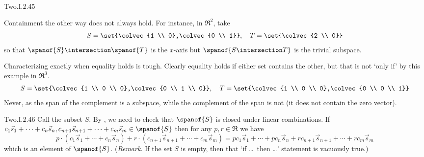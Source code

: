 \begin{ans}{Two.I.2.45}
\begin{exparts}
           Containment the other way does not always hold.
           For instance, in \( \Re^2 \), take
           \begin{equation*}
             S=\set{\colvec{1 \\ 0},\colvec{0 \\ 1}},\quad
             T=\set{\colvec{2 \\ 0}}
           \end{equation*}
           so that \( \spanof{S}\intersection\spanof{T} \) is the \( x \)-axis
           but \( \spanof{S\intersection T}  \) is the trivial subspace.

           Characterizing exactly when equality holds is tough.
           Clearly equality holds if either set contains the other, but that is
           not `only if' by this example in \( \Re^3 \).
           \begin{equation*}
             S=\set{\colvec{1 \\ 0 \\ 0},\colvec{0 \\ 1 \\ 0}},
             \quad
             T=\set{\colvec{1 \\ 0 \\ 0},\colvec{0 \\ 0 \\ 1}}
           \end{equation*}
        \partsitem Never, as the span of the complement is a subspace, while
          the complement of the span is not (it does not contain the zero
          vector).
      \end{exparts}
     
\end{ans}
\begin{ans}{Two.I.2.46}
      Call the subset \( S \).
      By ,
      we need to check that
      \( \spanof{S} \) is closed under linear combinations.
      If \( c_1\vec{s}_1+\dots+c_n\vec{s}_n,
        c_{n+1}\vec{s}_{n+1}+\dots+c_m\vec{s}_m\in\spanof{S} \) then
      for any \( p,r\in\Re \) we have
      \begin{equation*}
        p\cdot(c_1\vec{s}_1+\cdots+c_n\vec{s}_n)+
             r\cdot(c_{n+1}\vec{s}_{n+1}+\cdots+c_m\vec{s}_m)
        =
        pc_1\vec{s}_1+\cdots+pc_n\vec{s}_n
          +rc_{n+1}\vec{s}_{n+1}+\cdots+rc_m\vec{s}_m
      \end{equation*}
      which is an element of \( \spanof{S} \).
      (\textit{Remark.}
      If the set $S$ is empty, then that
      `if \ldots\ then \ldots' statement is vacuously true.)
    
\end{ans}
